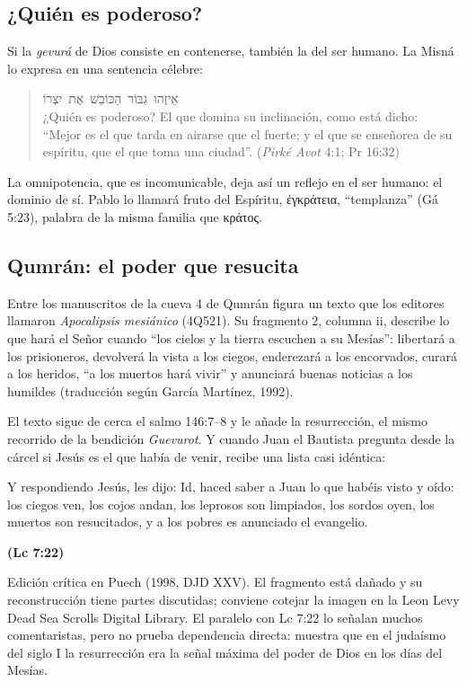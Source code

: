 \documentclass[11pt,letterpaper]{article}
\newcommand{\heb}[1]{\mbox{\foreignlanguage{hebrew}{#1}}}
\newcommand{\grc}[1]{\foreignlanguage{ancientgreek}{#1}}
\newcommand{\fuente}[1]{\par\hfill{\upshape\bfseries\small\textcolor{azul}{#1}}}
\begin{document}
\subsection{¿Quién es poderoso?}

Si la \emph{gevurá} de Dios consiste en contenerse, también la del ser humano. La Misná lo expresa en una sentencia célebre:

\begin{quote}\small
\heb{אֵיזֶהוּ גִבּוֹר הַכּוֹבֵשׁ אֶת יִצְרוֹ}\\
¿Quién es poderoso? El que domina su inclinación, como está dicho: ``Mejor es el que tarda en airarse que el fuerte; y el que se enseñorea de su espíritu, que el que toma una ciudad''. (\emph{Pirké Avot} 4:1; Pr 16:32)
\end{quote}

La omnipotencia, que es incomunicable, deja así un reflejo en el ser humano: el dominio de sí. Pablo lo llamará fruto del Espíritu, \grc{ἐγκράτεια}, ``templanza'' (Gá 5:23), palabra de la misma familia que \grc{κράτος}.

\subsection{Qumrán: el poder que resucita}

Entre los manuscritos de la cueva 4 de Qumrán figura un texto que los editores llamaron \emph{Apocalipsis mesiánico} (4Q521). Su fragmento 2, columna ii, describe lo que hará el Señor cuando ``los cielos y la tierra escuchen a su Mesías'': libertará a los prisioneros, devolverá la vista a los ciegos, enderezará a los encorvados, curará a los heridos, ``a los muertos hará vivir'' y anunciará buenas noticias a los humildes (traducción según García Martínez, 1992).

El texto sigue de cerca el salmo 146:7--8 y le añade la resurrección, el mismo recorrido de la bendición \emph{Guevurot}. Y cuando Juan el Bautista pregunta desde la cárcel si Jesús es el que había de venir, recibe una lista casi idéntica:

\begin{cita}Y respondiendo Jesús, les dijo: Id, haced saber a Juan lo que habéis visto y oído: los ciegos ven, los cojos andan, los leprosos son limpiados, los sordos oyen, los muertos son resucitados, y a los pobres es anunciado el evangelio.\fuente{(Lc 7:22)}\end{cita}

\begin{nota}[Precisión]
Edición crítica en Puech (1998, DJD XXV). El fragmento está dañado y su reconstrucción tiene partes discutidas; conviene cotejar la imagen en la Leon Levy Dead Sea Scrolls Digital Library. El paralelo con Lc 7:22 lo señalan muchos comentaristas, pero no prueba dependencia directa: muestra que en el judaísmo del siglo I la resurrección era la señal máxima del poder de Dios en los días del Mesías.
\end{nota}
\end{document}
